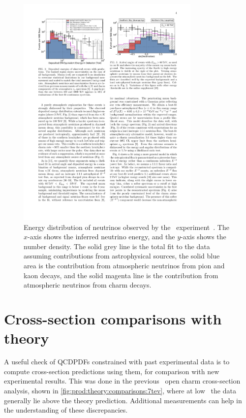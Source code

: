 \begin{figure}
  \centering
  \includegraphics[width=0.8\textwidth]{figures/production/icecube_energy_spectrum}
  \caption{%
    Energy distribution of neutrinos observed by the \icecube\ 
    experiment~\cite{Aartsen:2014gkd}.
    The $x$-axis shows the inferred neutrino energy, and the $y$-axis shows the 
    number density.
    The solid grey line is the total fit to the data assuming contributions 
    from astrophysical sources, the solid blue area is the contribution from 
    atmospheric neutrinos from pion and kaon decays, and the solid magenta line 
    is the contribution from atmospheric neutrinos from charm decays.
  }
  \label{fig:prod:theory:icecube_energy}
\end{figure}

\section{Cross-section comparisons with theory}
\label{chap:prod:theory:comparisons}

A useful check of \acp{QCDPDF} constrained with past experimental data is to 
compute cross-section predictions using them, for comparison with new 
experimental results.
This was done in the previous \lhcb\ open charm cross-section analysis, shown 
in \cref{fig:prod:theory:comparisons:7tev}, where at low \pT\ the data 
generally lie above the theory prediction.
Additional measurements can help in the understanding of these discrepancies.

